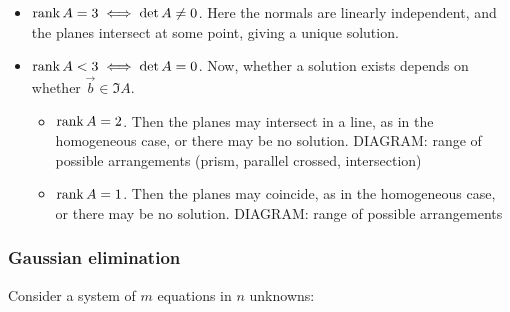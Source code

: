 \documentclass{../../template/note}
\begin{document}
    \begin{itemize}
        \item \(\operatorname{rank} A = 3 \iff \det A \neq 0\). Here the normals are linearly independent, and the planes intersect at some point, giving a unique solution.
        \item \(\operatorname{rank} A < 3 \iff \det A = 0\). Now, whether a solution exists depends on whether \(\vec b \in \Im A\).
        \begin{itemize}
            \item \(\operatorname{rank} A = 2\). Then the planes may intersect in a line, as in the homogeneous case, or there may be no solution.
            DIAGRAM: range of possible arrangements (prism, parallel crossed, intersection)
            \item \(\operatorname{rank} A = 1\). Then the planes may coincide, as in the homogeneous case, or there may be no solution.
            DIAGRAM: range of possible arrangements
        \end{itemize}
    \end{itemize}
    
    \subsubsection{Gaussian elimination}

    Consider a system of \(m\) equations in \(n\) unknowns:
\end{document}
